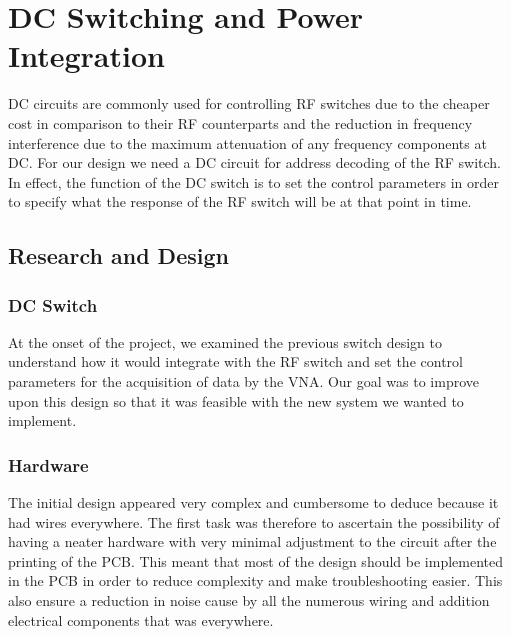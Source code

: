 
\section{DC Switching and Power Integration}

DC circuits are commonly used for controlling RF switches due to the cheaper cost in comparison to their RF counterparts and the reduction in frequency interference due to the maximum attenuation of any frequency components at DC. For our design we need a DC circuit for address decoding of the RF switch. In effect, the function of the DC switch is to set the control parameters in order to specify what the response of the RF switch will be at that point in time. 

\subsection{Research and Design}

\subsubsection{DC Switch}

At the onset of the project, we examined the previous switch design to understand how it would integrate with the RF switch and set the control parameters for the acquisition of data by the VNA. Our goal was to improve upon this design so that it was feasible with the new system we wanted to implement.

\subsubsection{Hardware}

The initial design appeared very complex and cumbersome to deduce because it had wires everywhere. The first task was therefore to ascertain the possibility of having a neater hardware with very minimal adjustment to the circuit after the printing of the PCB. This meant that most of the design should be implemented in the PCB in order to reduce complexity and make troubleshooting easier. This also ensure a reduction in noise cause by all the numerous wiring and addition electrical components that was everywhere.

